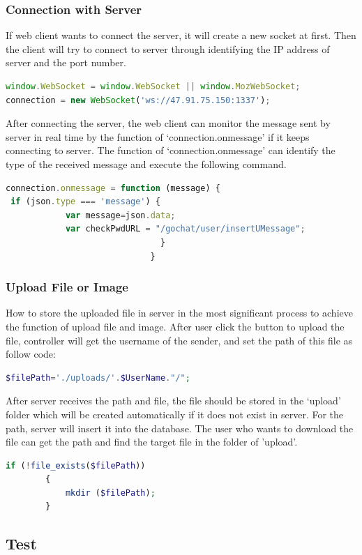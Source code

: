 \documentclass[a4paper,11pt]{article}
\begin{document}
\subsubsection*{Connection with Server}
If web client wants to connect the server, it will create a new socket at first. Then the client will try to connect to server through identifying the IP address of server and the port number. 
\begin{lstlisting}[language=javascript]
window.WebSocket = window.WebSocket || window.MozWebSocket;
connection = new WebSocket('ws://47.91.75.150:1337');
\end{lstlisting}
After connecting the server, the web client can monitor the message sent by server in real time by the function of ‘connection.onmessage’ if it keeps connecting to server. The function of ‘connection.onmessage’ can identify the type of the received message and execute the following command. 
\begin{lstlisting}[language=javascript]
connection.onmessage = function (message) {
 if (json.type === 'message') {
            var message=json.data;
            var checkPwdURL = "/gochat/user/insertUMessage";
                               }
                             }
\end{lstlisting}
\subsubsection*{Upload File or Image}
How to store the uploaded file in server in the most significant process to achieve the function of upload file and image. After user click the button to upload the file, controller will get the username of the sender, and set the path of this file as follow code:
\begin{lstlisting}[language=php]
 $filePath='./uploads/'.$UserName."/";
\end{lstlisting}
After server receives the path and file, the file should be stored in the ‘upload’ folder which will be created automatically if it does not exist in server. For the path, server will insert it into the database. The user who wants to download the file can get the path and find the target file in the folder of 'upload'.
\begin{lstlisting}[language=php]
 if (!file_exists($filePath))
        {
            mkdir ($filePath);
        }
\end{lstlisting}

\subsection{Test}
\end{document}

